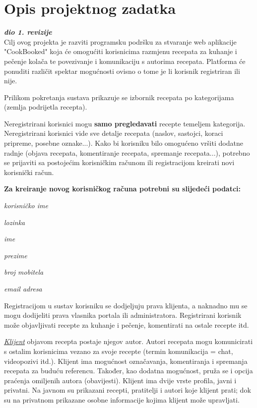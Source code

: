 \chapter{Opis projektnog zadatka}
		
		\textbf{\textit{dio 1. revizije}}\\
		
		Cilj ovog projekta je razviti programsku podršku za stvaranje web aplikacije "CookBooked" koja će
		omogućiti korisnicima razmjenu recepata za kuhanje i pečenje kolača te povezivanje i komunikaciju s autorima
		recepata. Platforma će ponuditi različit spektar mogućnosti ovisno o tome je li korisnik registriran ili nije.

		Prilikom pokretanja sustava prikazuje se izbornik recepata po kategorijama (zemlja podrijetla recepta).		
		
		Neregistrirani korisnici mogu \textbf{samo pregledavati} recepte temeljem kategorija.
		Neregistrirani korisnici vide sve detalje recepata (naslov, sastojci, koraci pripreme, posebne oznake...).
		Kako bi korisniku bilo omogućeno vršiti dodatne radnje (objava recepata, komentiranje recepata, spremanje recepata...),
		potrebno se prijaviti sa postojećim korisničkim računom ili registracijom kreirati novi korisnički račun.

		\textbf{
			Za kreiranje novog korisničkog računa potrebni su slijedeći podatci:
		}
		\begin{packed_item}
			\item \textit{korisničko ime}
			\item \textit{lozinka}
			\item \textit{ime}
			\item \textit{prezime}
			\item \textit{broj mobitela}
			\item \textit{email adresa}
		\end{packed_item}

		Registracijom u sustav korisniku se dodjeljuju prava klijenta, a naknadno mu se mogu dodijeliti prava
		vlasnika portala ili administratora. Registrirani korisnik može objavljivati recepte za kuhanje i pečenje,
		komentirati na ostale recepte itd.
				
		\underline{\textit{Klijent}} objavom recepta postaje njegov autor. Autori recepata mogu komunicirati s ostalim
		korisnicima vezano za svoje recepte (termin komunikacija = chat, videopozivi itd.). Klijent ima mogućnost označavanja, 
		komentiranja i spremanja recepata za buduću referencu. Također, kao dodatna mogućnost, pruža se i opcija praćenja 
		omiljenih autora (obavijesti). Klijent ima dvije vrste profila, javni i privatni. Na javnom su prikazani recepti,
		pratitelji i autori koje klijent prati; dok su na privatnom prikazane osobne informacije kojima klijent može
		upravljati.
		

